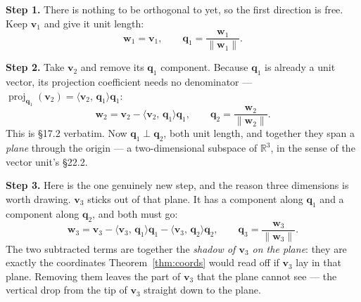 \documentclass[11pt]{article}
\theoremstyle{plain}
\theoremstyle{definition}
\theoremstyle{remark}
\newcommand{\R}{\mathbb{R}}
\newcommand{\vc}[1]{\mathbf{#1}}
\newcommand{\norm}[1]{\lVert #1\rVert}
\newcommand{\ip}[2]{\langle #1,\, #2\rangle}
\newcommand{\proj}[2]{\operatorname{proj}_{#1}(#2)}
\newcommand{\spn}{\operatorname{span}}
\begin{document}
\medskip
\noindent\textbf{Step 1.} There is nothing to be orthogonal to yet, so the first
direction is free. Keep $\vc{v}_{1}$ and give it unit length:
\[
  \vc{w}_{1} = \vc{v}_{1},
  \qquad
  \vc{q}_{1} = \frac{\vc{w}_{1}}{\norm{\vc{w}_{1}}} .
\]

\medskip
\noindent\textbf{Step 2.} Take $\vc{v}_{2}$ and remove its $\vc{q}_{1}$
component. Because $\vc{q}_{1}$ is already a unit vector, its projection
coefficient needs no denominator --- $\proj{\vc{q}_{1}}{\vc{v}_{2}}
= \ip{\vc{v}_{2}}{\vc{q}_{1}}\vc{q}_{1}$:
\[
  \vc{w}_{2} = \vc{v}_{2} - \ip{\vc{v}_{2}}{\vc{q}_{1}}\vc{q}_{1},
  \qquad
  \vc{q}_{2} = \frac{\vc{w}_{2}}{\norm{\vc{w}_{2}}} .
\]
This is \S17.2 verbatim. Now $\vc{q}_{1}\perp\vc{q}_{2}$, both unit length, and
together they span a \emph{plane} through the origin --- a two-dimensional
subspace of $\R^{3}$, in the sense of the vector unit's \S22.2.

\medskip
\noindent\textbf{Step 3.} Here is the one genuinely new step, and the reason
three dimensions is worth drawing. $\vc{v}_{3}$ sticks out of that plane. It has
a component along $\vc{q}_{1}$ and a component along $\vc{q}_{2}$, and both must
go:
\[
  \vc{w}_{3} = \vc{v}_{3}
             - \ip{\vc{v}_{3}}{\vc{q}_{1}}\vc{q}_{1}
             - \ip{\vc{v}_{3}}{\vc{q}_{2}}\vc{q}_{2},
  \qquad
  \vc{q}_{3} = \frac{\vc{w}_{3}}{\norm{\vc{w}_{3}}} .
\]
The two subtracted terms are together the \emph{shadow of $\vc{v}_{3}$ on the
plane}: they are exactly the coordinates Theorem~\ref{thm:coords} would read off
if $\vc{v}_{3}$ lay in that plane. Removing them leaves the part of $\vc{v}_{3}$
that the plane cannot see --- the vertical drop from the tip of $\vc{v}_{3}$
straight down to the plane.

\begin{center}
\end{center}
\end{document}
